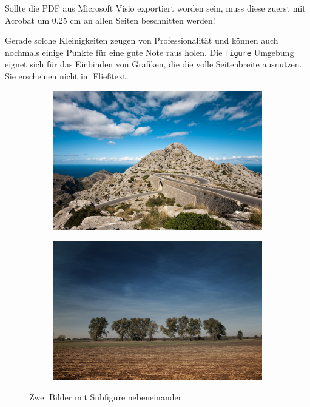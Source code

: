 Sollte die PDF aus Microsoft Visio exportiert worden sein, muss diese zuerst mit Acrobat um 0.25 cm an allen Seiten beschnitten werden!

Gerade solche Kleinigkeiten zeugen von Professionalität und können auch nochmals einige Punkte für eine gute Note raus holen. Die \texttt{figure} Umgebung eignet sich für das Einbinden von Grafiken, die die volle Seitenbreite ausnutzen. Sie erscheinen nicht im Fließtext.

\begin{figure}
	\begin{subfigure}[c]{0.49\textwidth}
		\includegraphics[width=\textwidth]{images/b1.jpg}
	\end{subfigure}
	\begin{subfigure}[c]{0.49\textwidth}
		\includegraphics[width=\textwidth]{images/b2.jpg}
	\end{subfigure}
	\caption{Zwei Bilder mit Subfigure nebeneinander}
\end{figure}

